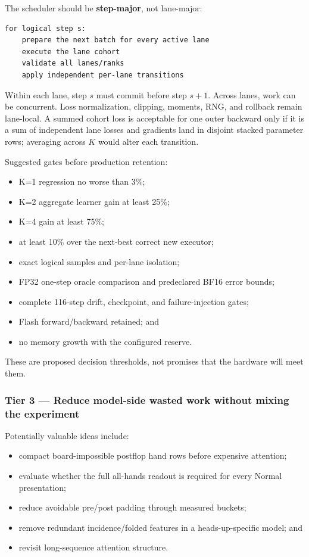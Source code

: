 \documentclass[
  10pt,
  letterpaper,
]{article}
\providecommand{\tightlist}{%
  \setlength{\itemsep}{0pt}\setlength{\parskip}{0pt}}
\begin{document}
The scheduler should be \textbf{step-major}, not lane-major:

\begin{verbatim}
for logical step s:
    prepare the next batch for every active lane
    execute the lane cohort
    validate all lanes/ranks
    apply independent per-lane transitions
\end{verbatim}

Within each lane, step \(s\) must commit before step \(s+1\). Across
lanes, work can be concurrent. Loss normalization, clipping, moments,
RNG, and rollback remain lane-local. A summed cohort loss is acceptable
for one outer backward only if it is a sum of independent lane losses
and gradients land in disjoint stacked parameter rows; averaging across
\(K\) would alter each transition.

Suggested gates before production retention:

\begin{itemize}
\tightlist
\item
  K=1 regression no worse than 3\%;
\item
  K=2 aggregate learner gain at least 25\%;
\item
  K=4 gain at least 75\%;
\item
  at least 10\% over the next-best correct new executor;
\item
  exact logical samples and per-lane isolation;
\item
  FP32 one-step oracle comparison and predeclared BF16 error bounds;
\item
  complete 116-step drift, checkpoint, and failure-injection gates;
\item
  Flash forward/backward retained; and
\item
  no memory growth with the configured reserve.
\end{itemize}

These are proposed decision thresholds, not promises that the hardware
will meet them.

\subsubsection{Tier 3 --- Reduce model-side wasted work without mixing
the
experiment}\label{tier-3--reduce-model-side-wasted-work-without-mixing-the-experiment}

Potentially valuable ideas include:

\begin{itemize}
\tightlist
\item
  compact board-impossible postflop hand rows before expensive
  attention;
\item
  evaluate whether the full all-hands readout is required for every
  Normal presentation;
\item
  reduce avoidable pre/post padding through measured buckets;
\item
  remove redundant incidence/folded features in a heads-up-specific
  model; and
\item
  revisit long-sequence attention structure.
\end{itemize}
\end{document}
